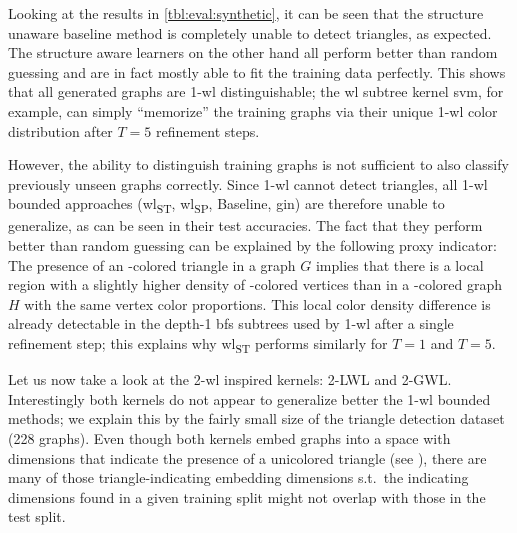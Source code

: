 Looking at the results in \cref{tbl:eval:synthetic}, it can be seen that the structure unaware baseline method is completely unable to detect triangles, as expected.
The structure aware learners on the other hand all perform better than random guessing and are in fact mostly able to fit the training data perfectly.
This shows that all generated graphs are 1-\acs{wl} distinguishable; the \ac{wl} subtree kernel \ac{svm}, for example, can simply ``memorize'' the training graphs via their unique 1-\acs{wl} color distribution after $T = 5$ refinement steps.

However, the ability to distinguish training graphs is not sufficient to also classify previously unseen graphs correctly.
Since 1-\acs{wl} cannot detect triangles, all 1-\acs{wl} bounded approaches (\acs{wl}\textsubscript{ST}, \acs{wl}\textsubscript{SP}, Baseline, \acs{gin}) are therefore unable to generalize, as can be seen in their test accuracies.
The fact that they perform better than random guessing can be explained by the following proxy indicator:
The presence of an -colored triangle in a graph $G$ implies that there is a local region with a slightly higher density of -colored vertices than in a -colored graph $H$ with the same vertex color proportions.
This local color density difference is already detectable in the depth-1 \acs{bfs} subtrees used by 1-\acs{wl} after a single refinement step; this explains why \acs{wl}\textsubscript{ST} performs similarly for $T = 1$ and $T = 5$.

Let us now take a look at the 2-\acs{wl} inspired kernels: 2-LWL and 2-GWL.\@
Interestingly both kernels do not appear to generalize better the 1-\acs{wl} bounded methods;
we explain this by the fairly small size of the triangle detection dataset (228 graphs).
Even though both kernels embed graphs into a space with dimensions that indicate the presence of a unicolored triangle (see ), there are many of those triangle-indicating embedding dimensions s.t.\ the indicating dimensions found in a given training split might not overlap with those in the test split.

